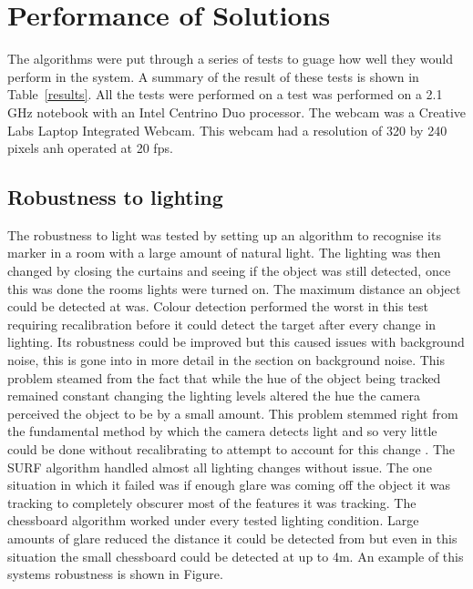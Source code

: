 \section{Performance of Solutions}
The algorithms were put through a series of tests to guage how well they would perform in the system. A summary of the result of these tests is shown in Table~\ref{results}. All the tests were performed on a test was performed on a 2.1 GHz notebook with an Intel Centrino Duo processor. The webcam was a Creative Labs Laptop Integrated Webcam. This webcam had a resolution of 320 by 240 pixels anh operated at 20 fps.

\subsection{Robustness to lighting}
The robustness to light was tested by setting up an algorithm to recognise its marker in a room with a large amount of natural light. The lighting was then changed by closing the curtains and seeing if the object was still detected, once this was done the rooms lights were turned on. The maximum distance an object could be detected at was. Colour detection performed the worst in this test requiring recalibration before it could detect the target after every change in lighting. Its robustness could be improved but this caused issues with background noise, this is gone into in more detail in the section on background noise. This problem steamed from the fact that while the hue of the object being tracked remained constant changing the lighting levels altered the hue the camera perceived the object to be by a small amount. This problem stemmed right from the fundamental method by which the camera detects light and so very little could be done without recalibrating to attempt to account for this change \cite{detect}. The SURF algorithm handled almost all lighting changes without issue. The one situation in which it failed was if enough glare was coming off the object it was tracking to completely obscurer most of the features it was tracking. The chessboard algorithm worked under every tested lighting condition. Large amounts of glare reduced the distance it could be detected from but even in this situation the small chessboard could be detected at up to 4m. An example of this systems robustness is shown in Figure.

